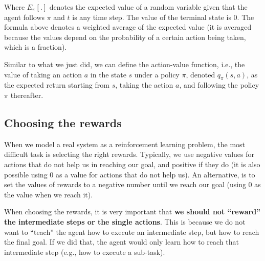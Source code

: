 Where $E_\pi [.]$ denotes the expected value of a random variable given that the agent follows $\pi$ and $t$ is any time step. The value of the terminal state is $0$. The formula above denotes a weighted average of the expected value (it is averaged because the values depend on the probability of a certain action being taken, which is a fraction).

Similar to what we just did, we can define the action-value function, i.e., the value of taking an action $a$ in the state $s$ under a policy $\pi$, denoted $q_\pi (s,a)$, as the expected return starting from $s$, taking the action $a$, and following the policy $\pi$ thereafter.

\subsection{Choosing the rewards}
When we model a real system as a reinforcement learning problem, the most difficult task is selecting the right rewards. Typically, we use negative values for actions that do not help us in reaching our goal, and positive if they do (it is also possible using 0 as a value for actions that do not help us). An alternative, is to set the values of rewards to a negative number until we reach our goal (using 0 as the value when we reach it).

When choosing the rewards, it is very important that \textbf{we should not ``reward'' the intermediate steps or the single actions}. This is because we do not want to “teach” the agent how to execute an intermediate step, but how to reach the final goal. If we did that, the agent would only learn how to reach that intermediate step (e.g., how to execute a sub-task).